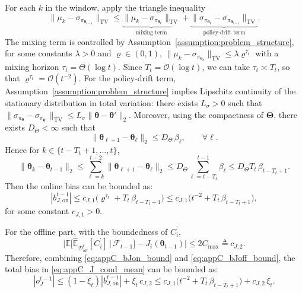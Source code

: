 \documentclass{IEEEtran}
\begin{document}
For each $k$ in the window, apply the triangle inequality
\begin{equation}
\big\|\mu_k-\sigma_{\pi_{\boldsymbol{\theta}_{t-1}}}\big\|_{\mathrm{TV}}
\le
\underbrace{\big\|\mu_k-\sigma_{\pi_{\boldsymbol{\theta}_{k}}}\big\|_{\mathrm{TV}}}_{\text{mixing term}}
+
\underbrace{\big\|\sigma_{\pi_{\boldsymbol{\theta}_{k}}}-\sigma_{\pi_{\boldsymbol{\theta}_{t-1}}}\big\|_{\mathrm{TV}}}_{\text{policy-drift term}}.
\label{eq:appC_tv_split}
\end{equation}
The mixing term is controlled by Assumption~\ref{assumption:problem_structure}, for some constants $\lambda>0$ and $\varrho\in(0,1)$, $\|\mu_k-\sigma_{\pi_{\boldsymbol{\theta}_k}}\|_{\mathrm{TV}}\le \lambda\varrho^{\tau_t}$ with a mixing horizon $\tau_t=\Theta(\log t)$. Since $T_t=\mathcal{O}(\log t)$, we can take $\tau_t\asymp T_t$, so that $\varrho^{\tau_t}=\mathcal{O}(t^{-2})$. For the policy-drift term, Assumption~\ref{assumption:problem_structure} implies Lipschitz continuity of the stationary distribution in total variation:
there exists $L_{\sigma}>0$ such that
$\|\sigma_{\pi_{\boldsymbol{\theta}}}-\sigma_{\pi_{\boldsymbol{\theta}'}}\|_{\mathrm{TV}}\le L_{\sigma}\|\boldsymbol{\theta}-\boldsymbol{\theta}'\|_2$. Moreover, using the compactness of $\boldsymbol{\Theta}$, there exists $D_{\Theta}<\infty$ such that
\begin{equation}
\|\boldsymbol{\theta}_{\ell+1}-\boldsymbol{\theta}_{\ell}\|_2\le D_{\Theta}\,\beta_{\ell},\qquad \forall \ell.
\label{eq:appC_theta_step}
\end{equation}
Hence for $k\in\{t-T_t+1,\ldots,t\}$,
\begin{equation}
\|\boldsymbol{\theta}_{k}-\boldsymbol{\theta}_{t-1}\|_2
\le \sum_{\ell=k}^{t-2}\|\boldsymbol{\theta}_{\ell+1}-\boldsymbol{\theta}_{\ell}\|_2
\le D_{\Theta}\sum_{\ell=t-T_t}^{t-1}\beta_{\ell}
\le D_{\Theta}T_t\,\beta_{t-T_t+1}.
\label{eq:appC_theta_drift_window}
\end{equation}
Then the online bias can be bounded as: 
\begin{equation}
|b_{J,\mathrm{on}}^{t-1}|
\le c_{J,1}\Big(\varrho^{\tau_t}+T_t\,\beta_{t-T_t+1}\Big)
\le c_{J,1}\Big(t^{-2}+T_t\,\beta_{t-T_t+1}\Big),
\label{eq:appC_bJon_bound}
\end{equation}
for some constant $c_{J,1}>0$.

For the offline part, with the boundedness of $C_i^{\text{'}}$,
\begin{equation}
\bigg|\mathbb{E}\Big[\hat{\mathbb{E}}_{\mathcal{D}_{\mathrm{off}}^{t}}[C_i^{\text{'}}]\,\Big|\,\mathcal{F}_{t-1}\Big]-J_i(\boldsymbol{\theta}_{t-1})\bigg|
\le 2C_{\max}
\triangleq c_{J,2}.
\label{eq:appC_bJoff_bound}
\end{equation}
Therefore, combining \eqref{eq:appC_bJon_bound} and \eqref{eq:appC_bJoff_bound}, the total bias in \eqref{eq:appC_J_cond_mean} can be bounded as: 
\begin{equation}
|o_J^{t-1}|
\le (1-\xi_t)|b_{J,\mathrm{on}}^{t-1}|+\xi_t\,c_{J,2}
\le c_{J,1}\Big(t^{-2}+T_t\,\beta_{t-T_t+1}\Big)+c_{J,2}\,\xi_t.
\label{eq:appC_oJ_bound}
\end{equation}
\end{document}
